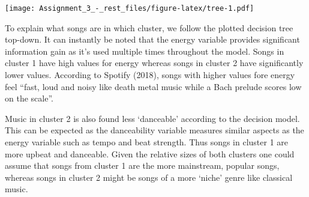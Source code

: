 \documentclass[]{article}
\newenvironment{Shaded}{\begin{snugshade}}{\end{snugshade}}
\newcommand{\KeywordTok}[1]{\textcolor[rgb]{0.13,0.29,0.53}{\textbf{#1}}}
\newcommand{\DataTypeTok}[1]{\textcolor[rgb]{0.13,0.29,0.53}{#1}}
\newcommand{\DecValTok}[1]{\textcolor[rgb]{0.00,0.00,0.81}{#1}}
\newcommand{\StringTok}[1]{\textcolor[rgb]{0.31,0.60,0.02}{#1}}
\newcommand{\CommentTok}[1]{\textcolor[rgb]{0.56,0.35,0.01}{\textit{#1}}}
\newcommand{\OperatorTok}[1]{\textcolor[rgb]{0.81,0.36,0.00}{\textbf{#1}}}
\newcommand{\NormalTok}[1]{#1}
\begin{document}
\begin{Shaded}
\end{Shaded}

\texttt{[image: Assignment\_3\_-\_rest\_files/figure-latex/tree-1.pdf]}

To explain what songs are in which cluster, we follow the plotted
decision tree top-down. It can instantly be noted that the energy
variable provides significant information gain as it's used multiple
times throughout the model. Songs in cluster 1 have high values for
energy whereas songs in cluster 2 have significantly lower values.
According to Spotify (2018), songs with higher values fore energy feel
``fast, loud and noisy like death metal music while a Bach prelude
scores low on the scale''.

Music in cluster 2 is also found less `danceable' according to the
decision model. This can be expected as the danceability variable
measures similar aspects as the energy variable such as tempo and beat
strength. Thus songs in cluster 1 are more upbeat and danceable. Given
the relative sizes of both clusters one could assume that songs from
cluster 1 are the more mainstream, popular songs, whereas songs in
cluster 2 might be songs of a more `niche' genre like classical music.
\end{document}
